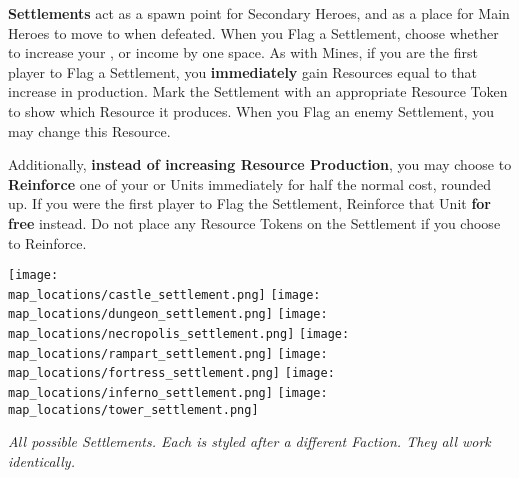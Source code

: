\begin{multicols*}{2}
\textbf{Settlements} act as a spawn point for Secondary Heroes, and as a place for Main Heroes to move to when defeated.
When you Flag a Settlement, choose whether to increase your ,  or  income by one space.
As with Mines, if you are the first player to Flag a Settlement, you \textbf{immediately} gain Resources equal to that increase in production.
Mark the Settlement with an appropriate Resource Token to show which Resource it produces.
When you Flag an enemy Settlement, you may change this Resource.\par
Additionally, \textbf{instead of increasing Resource Production}, you may choose to \textbf{Reinforce} one of your  or  Units immediately for half the normal cost, rounded up.
If you were the first player to Flag the Settlement, Reinforce that Unit \textbf{for free} instead.
Do not place any Resource Tokens on the Settlement if you choose to Reinforce.

\bigbreak

\begin{minipage}[h]{\linewidth}
  \centering
  \texttt{[image: \\map\_locations/castle\_settlement.png]}
  \texttt{[image: \\map\_locations/dungeon\_settlement.png]}
  \texttt{[image: \\map\_locations/necropolis\_settlement.png]}
  \texttt{[image: \\map\_locations/rampart\_settlement.png]}
  \texttt{[image: \\map\_locations/fortress\_settlement.png]}
  \texttt{[image: \\map\_locations/inferno\_settlement.png]}
  \texttt{[image: \\map\_locations/tower\_settlement.png]}
  \par
  \textit{All possible Settlements.
  Each is styled after a different Faction.
  They all work identically.}
\end{minipage}
\end{multicols*}
\bigbreak

\subsection*{}

